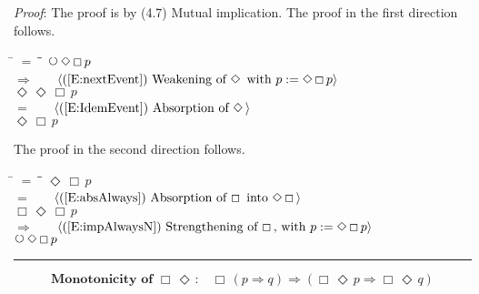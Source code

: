\documentclass[12pt, fleqn, leqno]{article}
\newcommand{\lgap}{2pt}                             %
\newcommand{\mymathindent}{24pt}                    %
\newcommand{\impl}{\ensuremath{\Rightarrow}}        %
\newcommand{\Next}{\;\,\text{\raisebox{3.5pt}{\circle{6}}}}
\newcommand{\Event}{\Diamond\,}
\newcommand{\Always}{\Box\,}
\newcommand{\myqed}{\rule[-.23ex]{1.2ex}{2.0ex}}
\newcommand{\myqedtab}{\hspace{384pt}}              %
\newcommand{\Gll} {\langle}                         %
\newcommand{\Ggg} {\rangle}                         %
\newcommand{\Hint}[1]     {\ \ \ $\Gll              \mbox{#1} \Ggg$ }   %
\begin{document}
\emph{Proof}: The proof is by (4.7) Mutual implication.
The proof in the first direction follows.
\begin{tabbing}
\hspace{\mymathindent} \= $= \;$ \= \myqedtab \= \kill
  \> \>   $\Next\Event\Always p$\\[\lgap]
  \> $\impl$  \>  \Hint{(\ref{E:nextEvent}) Weakening of $\Event$ with $p :=  \Event\Always p$}\\[\lgap]
  \> \>   $\Event\Event\Always p$\\[\lgap]
  \> $=$  \>  \Hint{(\ref{E:IdemEvent}) Absorption of $\Event$}\\[\lgap]
  \> \>   $\Event\Always p$
\end{tabbing}
The proof in the second direction follows.
\begin{tabbing}
\hspace{\mymathindent} \= $= \;$ \= \myqedtab \= \kill
  \> \>   $\Event\Always p$\\[\lgap]
  \> $=$  \>  \Hint{(\ref{E:absAlways}) Absorption of $\Always$ into $\Event\Always$}\\[\lgap]
  \> \>   $\Always\Event\Always p$\\[\lgap]
  \> $\impl$  \>  \Hint{(\ref{E:impAlwaysN}) Strengthening of $\Always$, with $p := \Event\Always p$}\\[\lgap]
  \> \>   $\Next\Event\Always p$ \quad \myqed
\end{tabbing}
\begin{equation}\label{E:monoAlwaysEvent}
\textbf{Monotonicity of $\Always\Event$:}\quad \Always (p \impl q) \impl (\Always\Event p \impl \Always\Event q)
\end{equation}
\end{document}
